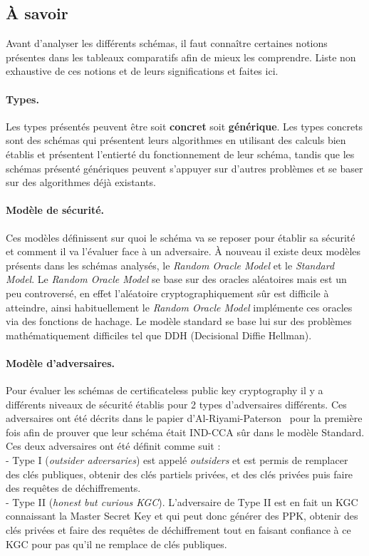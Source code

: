 \subsection{À savoir}
\label{subsec:asavoir}
Avant d'analyser les différents schémas, il faut connaître certaines notions présentes dans les tableaux comparatifs afin de mieux les comprendre. Liste non exhaustive de ces notions et de leurs significations et faites ici.
\paragraph*{Types.}Les types présentés peuvent être soit \textbf{concret} soit \textbf{générique}. Les types concrets sont des schémas qui présentent leurs algorithmes en utilisant des calculs bien établis et présentent l'entierté du fonctionnement de leur schéma, tandis que les schémas présenté génériques peuvent s'appuyer sur d'autres problèmes et se baser sur des algorithmes déjà existants.\\
\paragraph*{Modèle de sécurité.} Ces modèles définissent sur quoi le schéma va se reposer pour établir sa sécurité et comment il va l'évaluer face à un adversaire. À nouveau il existe deux modèles présents dans les schémas analysés, le \textit{Random Oracle Model} et le \textit{Standard Model}. Le \textit{Random Oracle Model} se base sur des oracles aléatoires mais est un peu controversé, en effet l'aléatoire cryptographiquement sûr est difficile à atteindre, ainsi habituellement le \textit{Random Oracle Model} implémente ces oracles via des fonctions de hachage. Le modèle standard se base lui sur des problèmes mathématiquement difficiles tel que DDH (Decisional Diffie Hellman). \\
\paragraph*{Modèle d'adversaires.}
Pour évaluer les schémas de certificateless public key cryptography il y a différents niveaux de sécurité établis pour 2 types d'adversaires différents. Ces adversaires ont été décrits dans le papier d'Al-Riyami-Paterson~\cite{DBLP:conf/asiacrypt/Al-RiyamiP03} pour la première fois afin de prouver que leur schéma était IND-CCA sûr dans le modèle Standard. Ces deux adversaires ont été définit comme suit :\\
- Type I (\textit{outsider adversaries}) est appelé \textit{outsiders} et est permis de remplacer des clés publiques, obtenir des clés partiels privées, et des clés privées puis faire des requêtes de déchiffrements.\\
- Type II (\textit{honest but curious KGC}). L'adversaire de Type II est en fait un KGC connaissant la Master Secret Key et qui peut donc générer des PPK, obtenir des clés privées et faire des requêtes de déchiffrement tout en faisant confiance à ce KGC pour pas qu'il ne remplace de clés publiques.\\
